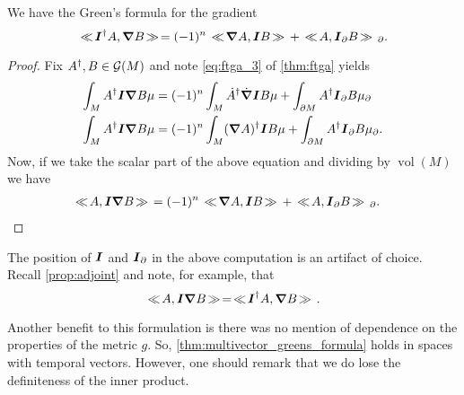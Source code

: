 \begin{theorem}
\label{thm:multivector_greens_formula}
We have the Green's formula for the gradient
\begin{equation}
\hspace*{.5mm}\ll \hspace*{-.5mm} \boldsymbol{I}^{\dagger} A, \boldsymbol{\nabla} B \hspace*{-.5mm}\gg \hspace*{.5mm} = (-1)^n \hspace*{.5mm}\ll \hspace*{-.5mm} \boldsymbol{\nabla} A, \boldsymbol{I} B \hspace*{-.5mm}\gg \hspace*{.5mm} + \hspace*{.5mm}\ll \hspace*{-.5mm} A, \boldsymbol{I}_\partial B \hspace*{-.5mm}\gg \hspace*{.5mm}_\partial.
\end{equation}
\end{theorem}
\begin{proof}
Fix $A^\dagger,B \in \mathcal{G}(M)$ and note \cref{eq:ftga_3} of \cref{thm:ftga} yields
\begin{align}
\int_M A^\dagger \boldsymbol{I} \boldsymbol{\nabla} B\mu &= (-1)^{n} \int_M \dot{A}^\dagger\dot{\boldsymbol{\nabla}} \boldsymbol{I} B \mu +  \int_{\partial M} A^\dagger \boldsymbol{I}_\partial B \mu_\partial\\
\int_M A^\dagger \boldsymbol{I} \boldsymbol{\nabla} B \mu &= (-1)^n \int_M (\boldsymbol{\nabla} A)^\dagger \boldsymbol{I} B \mu + \int_{\partial M} A^\dagger \boldsymbol{I}_\partial B \mu_\partial.
\end{align}
Now, if we take the scalar part of the above equation and dividing by $\operatorname{vol}(M)$ we have
\begin{align}
\hspace*{.5mm}\ll \hspace*{-.5mm} A, \boldsymbol{I}\boldsymbol{\nabla} B \hspace*{-.5mm}\gg \hspace*{.5mm} &= (-1)^n \hspace*{.5mm}\ll \hspace*{-.5mm} \boldsymbol{\nabla} A, \boldsymbol{I} B \hspace*{-.5mm}\gg \hspace*{.5mm} + \hspace*{.5mm}\ll \hspace*{-.5mm} A, \boldsymbol{I}_\partial B \hspace*{-.5mm}\gg \hspace*{.5mm}_\partial.
\end{align}

\end{proof}
\begin{remark}
The position of $\boldsymbol{I}$ and $\boldsymbol{I}_\partial$ in the above computation is an artifact of choice. Recall \cref{prop:adjoint} and note, for example, that
\begin{equation}
\hspace*{.5mm}\ll \hspace*{-.5mm} A, \boldsymbol{I}\boldsymbol{\nabla} B \hspace*{-.5mm}\gg \hspace*{.5mm} = \hspace*{.5mm}\ll \hspace*{-.5mm} \boldsymbol{I}^{\dagger}A, \boldsymbol{\nabla}{B} \hspace*{-.5mm}\gg \hspace*{.5mm}.
\end{equation}
\end{remark}

Another benefit to this formulation is there was no mention of dependence on the properties of the metric $g$. So, \cref{thm:multivector_greens_formula} holds in spaces with temporal vectors. However, one should remark that we do lose the definiteness of the inner product.
